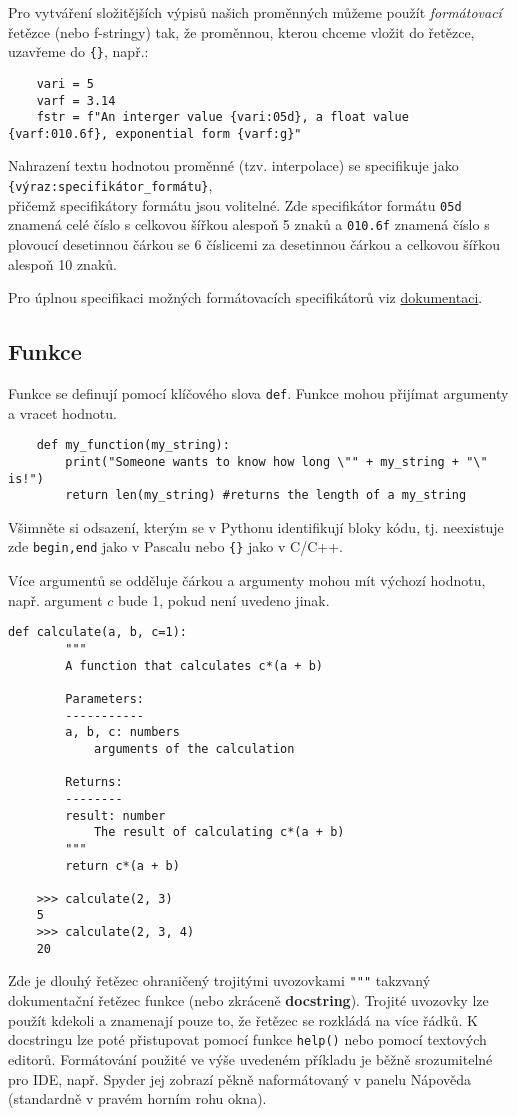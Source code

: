 Pro vytváření složitějších výpisů našich proměnných můžeme použít \emph{formátovací} řetězce (nebo f-stringy) tak, že proměnnou, kterou chceme vložit do řetězce, uzavřeme do \verb|{}|, např.:
\begin{lstlisting}
    vari = 5
    varf = 3.14
    fstr = f"An interger value {vari:05d}, a float value {varf:010.6f}, exponential form {varf:g}"
\end{lstlisting}
Nahrazení textu hodnotou proměnné (tzv. interpolace) se specifikuje jako\\\verb|{výraz:specifikátor_formátu}|,\\ přičemž specifikátory formátu jsou volitelné. Zde specifikátor formátu \verb|05d| znamená celé číslo s celkovou šířkou alespoň 5 znaků a \verb|010.6f| znamená číslo s plovoucí desetinnou čárkou se 6 číslicemi za desetinnou čárkou a celkovou šířkou alespoň 10 znaků.

Pro úplnou specifikaci možných formátovacích specifikátorů viz \href{https://docs.python.org/3/library/string.html\#formatspec}{dokumentaci}.

\subsection{Funkce}
Funkce se definují pomocí klíčového slova \verb|def|. Funkce mohou přijímat argumenty a vracet hodnotu.
\begin{lstlisting}
    def my_function(my_string):
        print("Someone wants to know how long \"" + my_string + "\" is!")
        return len(my_string) #returns the length of a my_string
\end{lstlisting}
Všimněte si odsazení, kterým se v Pythonu identifikují bloky kódu, tj. neexistuje zde \verb|begin,end| jako v Pascalu nebo \verb|{}| jako v C/C++.

Více argumentů se odděluje čárkou a argumenty mohou mít výchozí hodnotu, např. argument $c$ bude 1, pokud není uvedeno jinak.
\begin{lstlisting}[caption=Definice funkce]
    def calculate(a, b, c=1):
        """
        A function that calculates c*(a + b)

        Parameters:
        -----------
        a, b, c: numbers
            arguments of the calculation

        Returns:
        --------
        result: number
            The result of calculating c*(a + b)
        """
        return c*(a + b)

    >>> calculate(2, 3)
    5
    >>> calculate(2, 3, 4)
    20
\end{lstlisting}
Zde je dlouhý řetězec ohraničený trojitými uvozovkami \lstinline{"""} takzvaný dokumentační řetězec funkce (nebo zkráceně \textbf{docstring}). Trojité uvozovky lze použít kdekoli a znamenají pouze to, že řetězec se rozkládá na více řádků. K docstringu lze poté přistupovat pomocí funkce \lstinline{help()} nebo pomocí textových editorů. Formátování použité ve výše uvedeném příkladu je běžně srozumitelné pro IDE, např. Spyder jej zobrazí pěkně naformátovaný v panelu Nápověda (standardně v pravém horním rohu okna).

